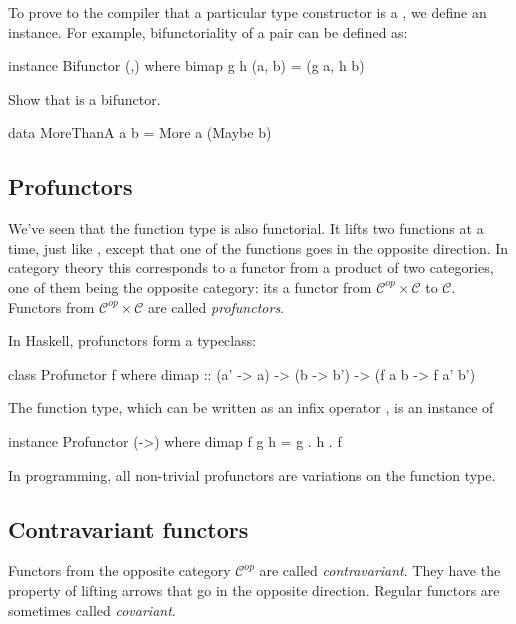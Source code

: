 \documentclass[DaoFP]{subfiles}
\begin{document}
To prove to the compiler that a particular type constructor is a , we define an instance. For example, bifunctoriality of a pair can be defined as:
\begin{haskell}
instance Bifunctor (,) where
  bimap g h (a, b) = (g a, h b)
\end{haskell}

\begin{exercise}
Show that  is a bifunctor.
\begin{haskell}
data MoreThanA a b = More a (Maybe b)
\end{haskell}
\end{exercise}


\subsection{Profunctors}

We've seen that the function type is also functorial. It lifts two functions at a time, just like , except that one of the functions goes in the opposite direction. In category theory this corresponds to a functor from a product of two categories, one of them being the opposite category: its a functor from $\mathcal{C}^{op} \times \mathcal{C}$ to $\mathcal{C}$. Functors from $\mathcal{C}^{op} \times \mathcal{C}$ are called \emph{profunctors}.

In Haskell, profunctors form a typeclass:
\begin{haskell}
class Profunctor f where
  dimap :: (a' -> a) -> (b -> b') -> (f a b -> f a' b')
\end{haskell}

The function type, which can be written as an infix operator \hask{(->)}, is an instance of 
\begin{haskell}
instance Profunctor (->) where
  dimap f g h = g . h . f
\end{haskell}

In programming, all non-trivial profunctors are variations on the function type. 

\subsection{Contravariant functors}

Functors from the opposite category $\mathcal{C}^{op}$ are called \emph{contravariant}. They have the property of lifting arrows that go in the opposite direction. Regular functors are sometimes called \emph{covariant}.
\end{document}
